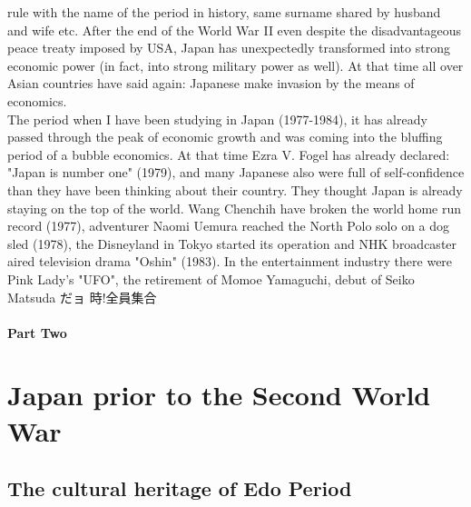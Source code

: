 \documentclass[11pt]{book}
\begin{document}
rule with the name of the period in history, same surname shared by husband and wife etc. After the end of the World War II even despite the
disadvantageous peace treaty imposed by USA, Japan has unexpectedly transformed into strong economic power (in fact, into strong military power
as well). At that time all over Asian countries have said again: Japanese make invasion by the means of economics.\\
The period when I have been studying in  Japan (1977-1984), it has already passed through the peak of economic growth and was coming into the 
bluffing period of a bubble economics. At that time Ezra V. Fogel has already declared: "Japan is number one" (1979),
and many Japanese also were full
of self-confidence than they have been thinking about their country. They thought Japan is already staying on the top of the world. Wang Chenchih
have broken the world home run record (1977), adventurer Naomi Uemura reached the North Polo solo on a dog sled (1978), the Disneyland in Tokyo
started its operation and NHK broadcaster aired television drama "Oshin" (1983). In the entertainment industry there were
Pink Lady's "UFO", the retirement of Momoe Yamaguchi, debut of Seiko Matsuda
だョ 
時!全員集合

\subsection*{Part Two}
\part{Japan prior to the Second World War}
\chapter{The cultural heritage of Edo Period}
\end{document}
